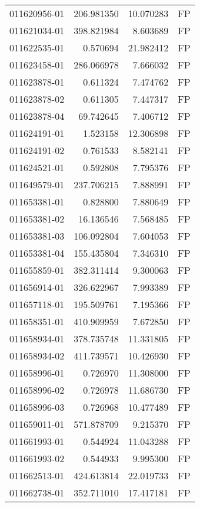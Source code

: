 \begin{tabular}{lrrl}
011620956-01 &  206.981350 &    10.070283 &   FP \\
011621034-01 &  398.821984 &     8.603689 &   FP \\
011622535-01 &    0.570694 &    21.982412 &   FP \\
011623458-01 &  286.066978 &     7.666032 &   FP \\
011623878-01 &    0.611324 &     7.474762 &   FP \\
011623878-02 &    0.611305 &     7.447317 &   FP \\
011623878-04 &   69.742645 &     7.406712 &   FP \\
011624191-01 &    1.523158 &    12.306898 &   FP \\
011624191-02 &    0.761533 &     8.582141 &   FP \\
011624521-01 &    0.592808 &     7.795376 &   FP \\
011649579-01 &  237.706215 &     7.888991 &   FP \\
011653381-01 &    0.828800 &     7.880649 &   FP \\
011653381-02 &   16.136546 &     7.568485 &   FP \\
011653381-03 &  106.092804 &     7.604053 &   FP \\
011653381-04 &  155.435804 &     7.346310 &   FP \\
011655859-01 &  382.311414 &     9.300063 &   FP \\
011656914-01 &  326.622967 &     7.993389 &   FP \\
011657118-01 &  195.509761 &     7.195366 &   FP \\
011658351-01 &  410.909959 &     7.672850 &   FP \\
011658934-01 &  378.735748 &    11.331805 &   FP \\
011658934-02 &  411.739571 &    10.426930 &   FP \\
011658996-01 &    0.726970 &    11.308000 &   FP \\
011658996-02 &    0.726978 &    11.686730 &   FP \\
011658996-03 &    0.726968 &    10.477489 &   FP \\
011659011-01 &  571.878709 &     9.215370 &   FP \\
011661993-01 &    0.544924 &    11.043288 &   FP \\
011661993-02 &    0.544933 &     9.995300 &   FP \\
011662513-01 &  424.613814 &    22.019733 &   FP \\
011662738-01 &  352.711010 &    17.417181 &   FP \\

\end{tabular}
